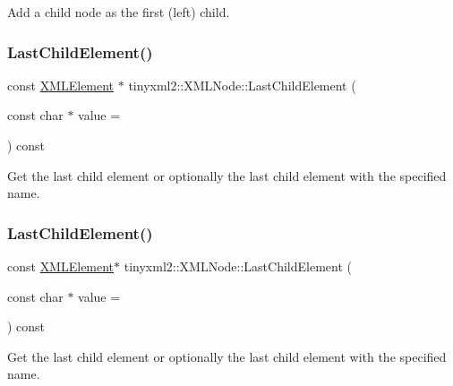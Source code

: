 Add a child node as the first (left) child. \mbox{\label{classtinyxml2_1_1XMLNode_a0cb35cd79e93f802a1506b6b517c331c}} 
\subsubsection{\texorpdfstring{Last\+Child\+Element()}{LastChildElement()}\hspace{0.1cm}{\footnotesize\ttfamily [1/2]}}
{\footnotesize\ttfamily const \hyperlink{classtinyxml2_1_1XMLElement}{X\+M\+L\+Element} $\ast$ tinyxml2\+::\+X\+M\+L\+Node\+::\+Last\+Child\+Element (\begin{DoxyParamCaption}\item[{const char $\ast$}]{value = {} }\end{DoxyParamCaption}) const}

Get the last child element or optionally the last child element with the specified name. \mbox{\label{classtinyxml2_1_1XMLNode_ac677414bce73321f0604dcee45541a8c}} 
\subsubsection{\texorpdfstring{Last\+Child\+Element()}{LastChildElement()}\hspace{0.1cm}{\footnotesize\ttfamily [2/2]}}
{\footnotesize\ttfamily const \hyperlink{classtinyxml2_1_1XMLElement}{X\+M\+L\+Element}$\ast$ tinyxml2\+::\+X\+M\+L\+Node\+::\+Last\+Child\+Element (\begin{DoxyParamCaption}\item[{const char $\ast$}]{value = {} }\end{DoxyParamCaption}) const}

Get the last child element or optionally the last child element with the specified name. \mbox{\label{classtinyxml2_1_1XMLNode_a09dd68cf9eae137579f6e50f36487513}} 
